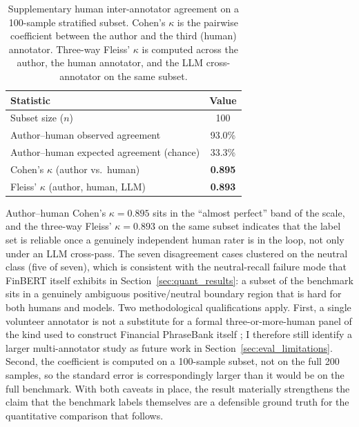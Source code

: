 \begin{table}[H]
  \centering
  \caption{Supplementary human inter-annotator agreement on a 100-sample stratified subset. Cohen's $\kappa$ is the pairwise coefficient between the author and the third (human) annotator. Three-way Fleiss' $\kappa$ is computed across the author, the human annotator, and the LLM cross-annotator on the same subset.}
  \label{tab:human_kappa}
  \begin{tabular}{@{}lc@{}}
    \toprule
    \textbf{Statistic} & \textbf{Value} \\
    \midrule
    Subset size ($n$)                                   & 100 \\
    Author--human observed agreement                    & 93.0\% \\
    Author--human expected agreement (chance)           & 33.3\% \\
    Cohen's $\kappa$ (author vs.\ human)                & \textbf{0.895} \\
    Fleiss' $\kappa$ (author, human, LLM)               & \textbf{0.893} \\
    \bottomrule
  \end{tabular}
\end{table}

Author--human Cohen's $\kappa = 0.895$ sits in the ``almost perfect'' band of the \citet{landis1977measurement} scale, and the three-way Fleiss' $\kappa = 0.893$ \citep{fleiss1971measuring} on the same subset indicates that the label set is reliable once a genuinely independent human rater is in the loop, not only under an LLM cross-pass. The seven disagreement cases clustered on the neutral class (five of seven), which is consistent with the neutral-recall failure mode that FinBERT itself exhibits in Section~\ref{sec:quant_results}: a subset of the benchmark sits in a genuinely ambiguous positive/neutral boundary region that is hard for both humans and models. Two methodological qualifications apply. First, a single volunteer annotator is not a substitute for a formal three-or-more-human panel of the kind used to construct Financial PhraseBank itself \citep{malo2014financialphrasebank}; I therefore still identify a larger multi-annotator study as future work in Section~\ref{sec:eval_limitations}. Second, the coefficient is computed on a 100-sample subset, not on the full 200 samples, so the standard error is correspondingly larger than it would be on the full benchmark. With both caveats in place, the result materially strengthens the claim that the benchmark labels themselves are a defensible ground truth for the quantitative comparison that follows.

